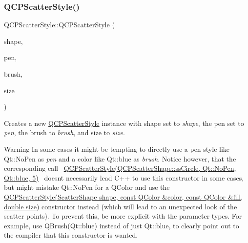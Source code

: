 \subsubsection{\texorpdfstring{Q\+C\+P\+Scatter\+Style()}{QCPScatterStyle()}\hspace{0.1cm}{\footnotesize\ttfamily [5/7]}}
{\footnotesize\ttfamily Q\+C\+P\+Scatter\+Style\+::\+Q\+C\+P\+Scatter\+Style (\begin{DoxyParamCaption}\item[{\hyperlink{class_q_c_p_scatter_style_adb31525af6b680e6f1b7472e43859349}{Scatter\+Shape}}]{shape,  }\item[{const Q\+Pen \&}]{pen,  }\item[{const Q\+Brush \&}]{brush,  }\item[{double}]{size }\end{DoxyParamCaption})}

Creates a new \hyperlink{class_q_c_p_scatter_style}{Q\+C\+P\+Scatter\+Style} instance with shape set to {\itshape shape}, the pen set to {\itshape pen}, the brush to {\itshape brush}, and size to {\itshape size}.

\begin{DoxyWarning}{Warning}
In some cases it might be tempting to directly use a pen style like {\ttfamily Qt\+::\+No\+Pen} as {\itshape pen} and a color like {\ttfamily Qt\+::blue} as {\itshape brush}. Notice however, that the corresponding call~\newline
{\ttfamily \hyperlink{class_q_c_p_scatter_style}{Q\+C\+P\+Scatter\+Style(\+Q\+C\+P\+Scatter\+Shape\+::ss\+Circle, Qt\+::\+No\+Pen, Qt\+::blue, 5)}}~\newline
doesn\textquotesingle{}t necessarily lead C++ to use this constructor in some cases, but might mistake {\ttfamily Qt\+::\+No\+Pen} for a Q\+Color and use the \hyperlink{class_q_c_p_scatter_style_a6e1b64f12cac7f07af180ae4316fd38d}{Q\+C\+P\+Scatter\+Style(\+Scatter\+Shape shape, const Q\+Color \&color, const Q\+Color \&fill, double size)} constructor instead (which will lead to an unexpected look of the scatter points). To prevent this, be more explicit with the parameter types. For example, use {\ttfamily Q\+Brush(\+Qt\+::blue)} instead of just {\ttfamily Qt\+::blue}, to clearly point out to the compiler that this constructor is wanted. 
\end{DoxyWarning}
\mbox{\label{class_q_c_p_scatter_style_a63962094587a4c2258435aa7933996cc}} 
